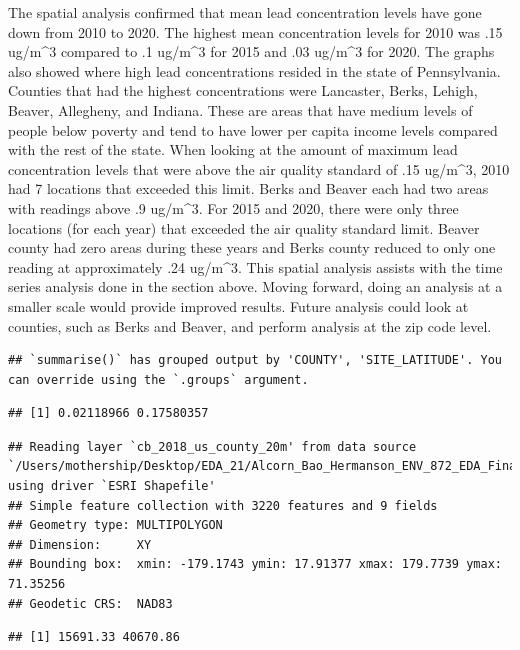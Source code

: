 \documentclass[
  12pt,
]{article}
\begin{document}
The spatial analysis confirmed that mean lead concentration levels have
gone down from 2010 to 2020. The highest mean concentration levels for
2010 was .15 ug/m\^{}3 compared to .1 ug/m\^{}3 for 2015 and .03
ug/m\^{}3 for 2020. The graphs also showed where high lead
concentrations resided in the state of Pennsylvania. Counties that had
the highest concentrations were Lancaster, Berks, Lehigh, Beaver,
Allegheny, and Indiana. These are areas that have medium levels of
people below poverty and tend to have lower per capita income levels
compared with the rest of the state. When looking at the amount of
maximum lead concentration levels that were above the air quality
standard of .15 ug/m\^{}3, 2010 had 7 locations that exceeded this
limit. Berks and Beaver each had two areas with readings above .9
ug/m\^{}3. For 2015 and 2020, there were only three locations (for each
year) that exceeded the air quality standard limit. Beaver county had
zero areas during these years and Berks county reduced to only one
reading at approximately .24 ug/m\^{}3. This spatial analysis assists
with the time series analysis done in the section above. Moving forward,
doing an analysis at a smaller scale would provide improved results.
Future analysis could look at counties, such as Berks and Beaver, and
perform analysis at the zip code level.

\begin{verbatim}
## `summarise()` has grouped output by 'COUNTY', 'SITE_LATITUDE'. You can override using the `.groups` argument.
\end{verbatim}

\begin{verbatim}
## [1] 0.02118966 0.17580357
\end{verbatim}

\begin{verbatim}
## Reading layer `cb_2018_us_county_20m' from data source `/Users/mothership/Desktop/EDA_21/Alcorn_Bao_Hermanson_ENV_872_EDA_FinalProject/Data/Spatial/cb_2018_us_county_20m.shp' using driver `ESRI Shapefile'
## Simple feature collection with 3220 features and 9 fields
## Geometry type: MULTIPOLYGON
## Dimension:     XY
## Bounding box:  xmin: -179.1743 ymin: 17.91377 xmax: 179.7739 ymax: 71.35256
## Geodetic CRS:  NAD83
\end{verbatim}

\begin{verbatim}
## [1] 15691.33 40670.86
\end{verbatim}
\end{document}
